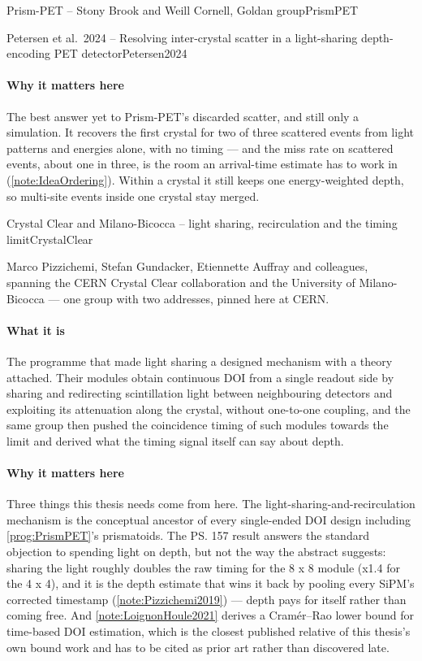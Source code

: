 \begin{programnote}{Prism-PET -- Stony Brook and Weill Cornell, Goldan group}{PrismPET}
\begin{papernote}{Petersen et al.\ 2024 -- Resolving inter-crystal scatter in a light-sharing depth-encoding PET detector}{Petersen2024}
\paragraph{Why it matters here}
The best answer yet to Prism-PET's discarded scatter, and still only a
simulation. It recovers the first crystal for two of three scattered events from
light patterns and energies alone, with no timing --- and the miss rate on
scattered events, about one in three, is the room an arrival-time estimate has
to work in (\ref{note:IdeaOrdering}). Within a crystal it still keeps one
energy-weighted depth, so multi-site events inside one crystal stay merged.
\end{papernote}

\end{programnote}

\begin{programnote}{Crystal Clear and Milano-Bicocca -- light sharing, recirculation and the timing limit}{CrystalClear}

Marco Pizzichemi, Stefan Gundacker, Etiennette Auffray and colleagues, spanning
the CERN Crystal Clear collaboration and the University of Milano-Bicocca ---
one group with two addresses, pinned here at CERN.

\paragraph{What it is}
The programme that made light sharing a designed mechanism with a theory
attached. Their modules obtain continuous DOI from a single readout side by
sharing and redirecting scintillation light between neighbouring detectors and
exploiting its attenuation along the crystal, without one-to-one coupling, and
the same group then pushed the coincidence timing of such modules towards the
limit and derived what the timing signal itself can say about depth.

\paragraph{Why it matters here}
Three things this thesis needs come from here. The
light-sharing-and-recirculation mechanism is the conceptual ancestor of every
single-ended DOI design including \ref{prog:PrismPET}'s prismatoids. The
\ps{157} result answers the standard objection to spending light on depth, but
not the way the abstract suggests: sharing the light roughly doubles the raw
timing for the 8 x 8 module (x1.4 for the 4 x 4),
and it is the depth estimate that wins it back by pooling every SiPM's
corrected timestamp (\ref{note:Pizzichemi2019}) --- depth pays for itself
rather than coming free. And \ref{note:LoignonHoule2021}
derives a Cramér--Rao lower bound for time-based DOI estimation, which is the
closest published relative of this thesis's own bound work and has to be cited
as prior art rather than discovered late.


\end{programnote}
